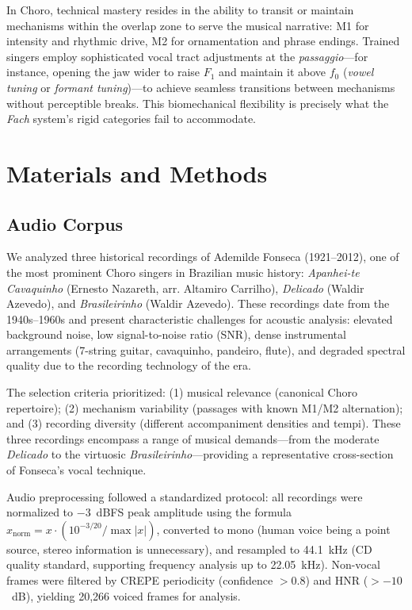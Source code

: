 \documentclass[review,3p,number]{elsarticle}
\begin{document}
In Choro, technical mastery resides in the ability to transit or maintain mechanisms
within the overlap zone to serve the musical narrative: M1 for intensity and rhythmic
drive, M2 for ornamentation and phrase endings. Trained singers employ sophisticated
vocal tract adjustments at the \emph{passaggio}---for instance, opening the jaw
wider to raise $F_1$ and maintain it above $f_0$ (\emph{vowel tuning} or \emph{formant
tuning})---to achieve seamless transitions between mechanisms without perceptible
breaks.\cite{bozeman2013,sundberg1987} This biomechanical flexibility is precisely
what the \emph{Fach} system's rigid categories fail to accommodate.

\section{Materials and Methods}
\label{sec:methods}

\subsection{Audio Corpus}
\label{sec:corpus}

We analyzed three historical recordings of Ademilde Fonseca (1921--2012), one of the
most prominent Choro singers in Brazilian music history: \emph{Apanhei-te Cavaquinho}
(Ernesto Nazareth, arr. Altamiro Carrilho), \emph{Delicado} (Waldir Azevedo), and
\emph{Brasileirinho} (Waldir Azevedo). These recordings date from the 1940s--1960s
and present characteristic challenges for acoustic analysis: elevated background
noise, low signal-to-noise ratio (SNR), dense instrumental arrangements (7-string
guitar, cavaquinho, pandeiro, flute), and degraded spectral quality due to the
recording technology of the era.

The selection criteria prioritized: (1) musical relevance (canonical Choro
repertoire); (2) mechanism variability (passages with known M1/M2 alternation); and
(3) recording diversity (different accompaniment densities and tempi). These three
recordings encompass a range of musical demands---from the moderate \emph{Delicado}
to the virtuosic \emph{Brasileirinho}---providing a representative cross-section of
Fonseca's vocal technique.

Audio preprocessing followed a standardized protocol: all recordings were normalized
to $-3$~dBFS peak amplitude using the formula $x_{\text{norm}} = x \cdot
(10^{-3/20} / \max|x|)$, converted to mono (human voice being a point source,
stereo information is unnecessary), and resampled to 44.1~kHz (CD quality standard,
supporting frequency analysis up to 22.05~kHz). Non-vocal frames were filtered by
CREPE periodicity (confidence $> 0.8$) and HNR ($> -10$~dB), yielding 20,266 voiced
frames for analysis.
\end{document}
